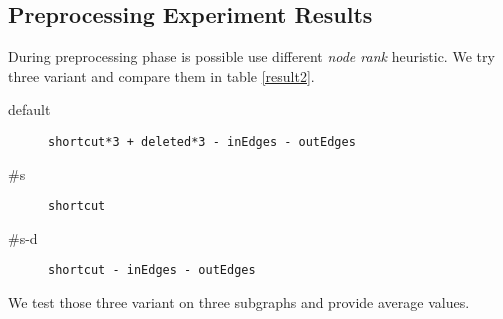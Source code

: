 \subsection{Preprocessing Experiment Results}

During preprocessing phase is possible use different {\em node rank} heuristic.
We try three variant and compare them in table \ref{result2}.
\begin{description}
    \item[default] {\tt shortcut*3 + deleted*3 -~inEdges -~outEdges} 
    \item[\#s] {\tt shortcut} 
    \item[\#s-d] {\tt shortcut -~inEdges -~outEdges} 
\end{description}
We test those three variant on three subgraphs and provide average values.

